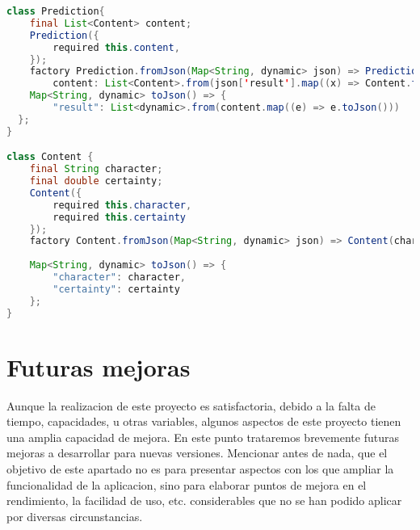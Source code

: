 \documentclass{article}
\begin{document}
\noindent\begin{minipage}{\textwidth}
\begin{lstlisting}[language=java]
class Prediction{
    final List<Content> content;
    Prediction({
        required this.content,
    });
    factory Prediction.fromJson(Map<String, dynamic> json) => Prediction(
        content: List<Content>.from(json['result'].map((x) => Content.fromJson(x))));
    Map<String, dynamic> toJson() => {
        "result": List<dynamic>.from(content.map((e) => e.toJson()))
  };
}

class Content {
    final String character;
    final double certainty;
    Content({
        required this.character,
        required this.certainty
    });
    factory Content.fromJson(Map<String, dynamic> json) => Content(character: json['character'], certainty: json['confidence']);
  
    Map<String, dynamic> toJson() => {
        "character": character,
        "certainty": certainty
    };
}
\end{lstlisting}
\end{minipage}





\newpage

\section{Futuras mejoras}

Aunque la realizacion de este proyecto es satisfactoria, debido a la falta de tiempo, capacidades, u otras variables, algunos aspectos de este proyecto tienen una amplia capacidad de mejora. En este punto trataremos brevemente futuras mejoras a desarrollar para nuevas versiones. Mencionar antes de nada, que el objetivo de este apartado no es para presentar aspectos con los que ampliar la funcionalidad de la aplicacion, sino para elaborar puntos de mejora en el rendimiento, la facilidad de uso, etc. considerables que no se han podido aplicar por diversas circunstancias.
\end{document}
